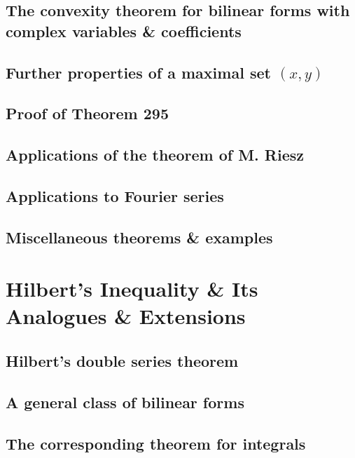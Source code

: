 \documentclass[oneside]{book}
\numberwithin{equation}{section}
\begin{document}
\subsection{The convexity theorem for bilinear forms with complex variables \& coefficients}

\subsection{Further properties of a maximal set $(x,y)$}

\subsection{Proof of Theorem 295}

\subsection{Applications of the theorem of M. Riesz}

\subsection{Applications to Fourier series}

\subsection{Miscellaneous theorems \& examples}


\section{Hilbert's Inequality \& Its Analogues \& Extensions}

\subsection{Hilbert's double series theorem}

\subsection{A general class of bilinear forms}

\subsection{The corresponding theorem for integrals}
\end{document}

